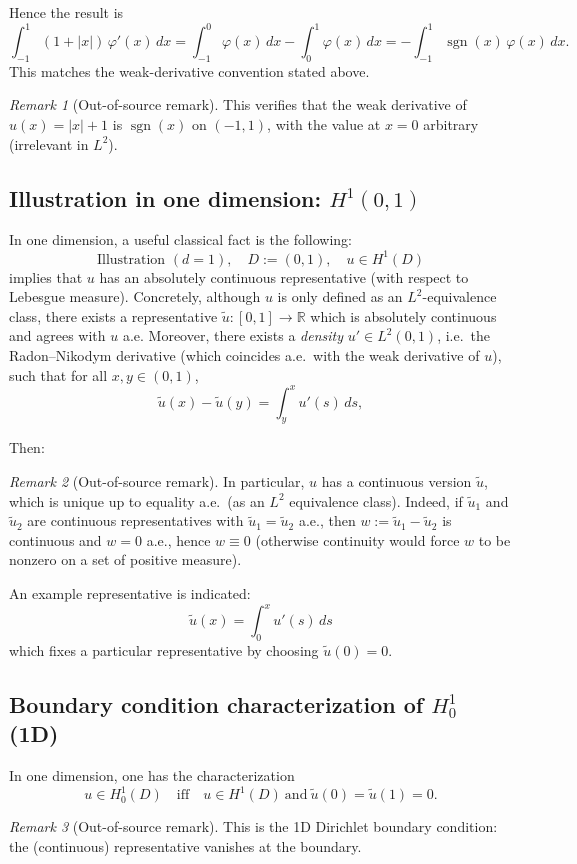 \documentclass[11pt]{article}
\theoremstyle{definition}
\theoremstyle{remark}
\newtheorem{remark}{Remark}
\begin{document}
Hence the result is
\[
\int_{-1}^1 (1+|x|)\,\varphi'(x)\,dx
=
\int_{-1}^{0}\varphi(x)\,dx - \int_{0}^{1}\varphi(x)\,dx
=
-\int_{-1}^{1}\operatorname{sgn}(x)\,\varphi(x)\,dx.
\]
This matches the weak-derivative convention stated above.

\begin{remark}[Out-of-source remark]
This verifies that the weak derivative of $u(x)=|x|+1$ is $\operatorname{sgn}(x)$ on $(-1,1)$, with the value at $x=0$ arbitrary (irrelevant in $L^2$).
\end{remark}

\subsection*{Illustration in one dimension: $H^1(0,1)$}

In one dimension, a useful classical fact is the following:
\[
\text{Illustration }(d=1),\quad D:=(0,1),\quad u\in H^1(D)
\]
implies that $u$ has an absolutely continuous representative (with respect to Lebesgue measure). Concretely, although $u$ is only defined as an $L^2$-equivalence class, there exists a representative $\tilde u:[0,1]\to\mathbb{R}$ which is absolutely continuous and agrees with $u$ a.e. Moreover, there exists a \emph{density} $u'\in L^2(0,1)$, i.e.\ the Radon--Nikodym derivative (which coincides a.e.\ with the weak derivative of $u$), such that for all $x,y\in(0,1)$,
\[
\tilde u(x)-\tilde u(y)=\int_y^x u'(s)\,ds,
\]

Then:
\begin{remark}[Out-of-source remark]
In particular, $u$ has a continuous version $\tilde u$, which is unique up to equality a.e.\ (as an $L^2$ equivalence class). Indeed, if $\tilde u_1$ and $\tilde u_2$ are continuous representatives with $\tilde u_1=\tilde u_2$ a.e., then $w:=\tilde u_1-\tilde u_2$ is continuous and $w=0$ a.e., hence $w\equiv 0$ (otherwise continuity would force $w$ to be nonzero on a set of positive measure).
\end{remark}

An example representative is indicated:
\[
\tilde u(x)=\int_0^x u'(s)\,ds
\]
which fixes a particular representative by choosing $\tilde u(0)=0$.

\subsection*{Boundary condition characterization of $H_0^1$ (1D)}

In one dimension, one has the characterization
\[
u\in H_0^1(D)
\quad\text{iff}\quad
u\in H^1(D)
\ \text{and}\ 
\tilde u(0)=\tilde u(1)=0.
\]
\begin{remark}[Out-of-source remark]
This is the 1D Dirichlet boundary condition: the (continuous) representative vanishes at the boundary.
\end{remark}
\end{document}
